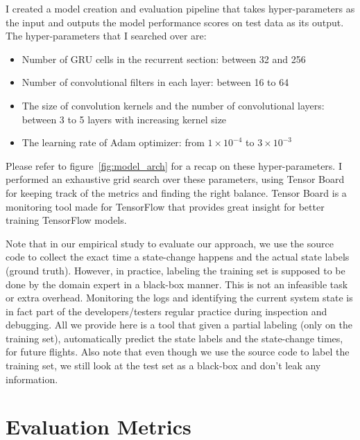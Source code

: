 I created a model creation and evaluation pipeline that takes hyper-parameters as the input and outputs the model performance scores on test data as its output. The hyper-parameters that I searched over are:
\begin{itemize}
    \item Number of GRU cells in the recurrent section: between 32 and 256
    \item Number of convolutional filters in each layer: between 16 to 64
    \item The size of convolution kernels and the number of convolutional layers: between 3 to 5 layers with increasing kernel size
    \item The learning rate of Adam optimizer: from $1\times 10^{-4}$ to $3\times10^{-3}$
\end{itemize}
Please refer to figure~\ref{fig:model_arch} for a recap on these hyper-parameters. 
I performed an exhaustive grid search over these parameters, using Tensor Board for keeping track of the metrics and finding the right balance.
Tensor Board is a monitoring tool made for TensorFlow \cite{tensorflow2015-whitepaper} that provides great insight for better training TensorFlow models.


Note that in our empirical study to evaluate our approach, we use the source code to collect the exact time a state-change happens and the actual state labels (ground truth). However, in practice, labeling the training set is supposed to be done by the domain expert in a black-box manner. This is not an infeasible task or extra overhead. Monitoring the logs and identifying the current system state is in fact part of the developers/testers regular practice during inspection and debugging. All we provide here is a tool that given a partial labeling (only on the training set), automatically predict the state labels and the state-change times, for future flights.  Also note that even though we use the source code to label the training set, we still look at the test set as a black-box and don't leak any information.

\section{Evaluation Metrics}
